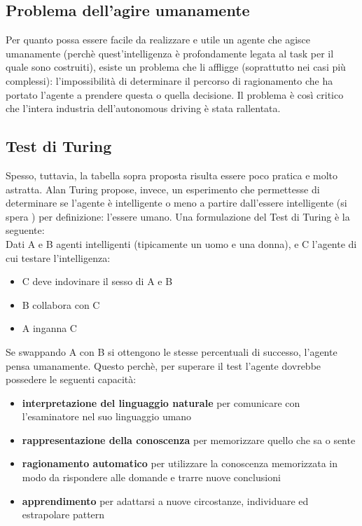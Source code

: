 \subsection{Problema dell'agire umanamente}
Per quanto possa essere facile da realizzare e utile un agente che agisce umanamente (perchè quest'intelligenza è profondamente legata al task per il quale sono costruiti), esiste un problema che li affligge (soprattutto nei casi più complessi): 
l'impossibilità di determinare il percorso di ragionamento che ha portato l'agente a prendere questa o quella decisione. 
Il problema è così critico che l'intera industria dell'autonomous driving è stata rallentata.  


\subsection{Test di Turing}
Spesso, tuttavia, la tabella sopra proposta risulta essere poco pratica e molto astratta. 
Alan Turing propose, invece, un esperimento che permettesse di determinare se l'agente è intelligente o meno a partire dall'essere intelligente (si spera ) per definizione: l'essere umano. 
Una formulazione del Test di Turing è la seguente:\\
Dati A e B agenti intelligenti (tipicamente un uomo e una donna), e C l'agente di cui testare l'intelligenza:
\begin{itemize}
    \item C deve indovinare il sesso di A e B
    \item B collabora con C
    \item A inganna C
\end{itemize}
Se swappando A con B si ottengono le stesse percentuali di successo, l'agente pensa umanamente.
Questo perchè, per superare il test l'agente dovrebbe possedere le seguenti capacità: 
\begin{itemize}
    \item \textbf{interpretazione del linguaggio naturale} per comunicare con l'esaminatore 
    nel suo linguaggio umano    
    \item \textbf{rappresentazione della conoscenza} per memorizzare quello che sa o sente
    \item \textbf{ragionamento automatico} per utilizzare la conoscenza memorizzata in modo 
    da rispondere alle domande e trarre nuove conclusioni
    \item \textbf{apprendimento} per adattarsi a nuove circostanze, individuare ed estrapolare pattern
\end{itemize}